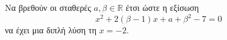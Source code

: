Να βρεθούν οι σταθερές $ a, \beta\in\mathbb{R} $ έτσι ώστε η εξίσωση
 \[ x^2+2(\beta-1)x+a+\beta^2-7=0 \] 
 να έχει μια διπλή λύση τη $ x=-2$.

